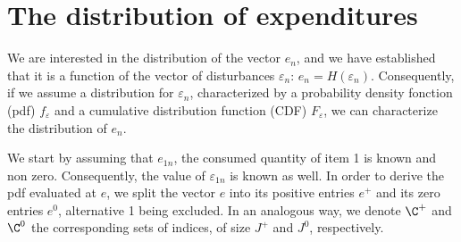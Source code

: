 \documentclass[12pt,a4paper]{article}
\begin{document}
\section{The distribution of expenditures}

We are interested in the distribution of the vector $e_n$, and we have
established that it is a function of the vector of disturbances
$\varepsilon_n$: $e_n = H(\varepsilon_n)$.  Consequently, if we assume
a distribution for $\varepsilon_n$, characterized by a probability
density fonction (pdf) $f_\varepsilon$ and a cumulative distribution
function (CDF) $F_\varepsilon$, we can characterize the distribution of $e_n$.

We start by assuming that $e_{1n}$, the consumed quantity of item 1 is
known and non zero. Consequently, the value of $\varepsilon_{1n}$ is known as
well. In order to derive the pdf evaluated at $e$, we split the vector $e$ into its positive entries $e^+$ and its zero entries $e^0$, alternative 1 being excluded. In an analogous way, we denote $\C^+$ and $\C^0$ the corresponding sets of indices, of size $J^+$ and $J^0$, respectively. 
\end{document}
